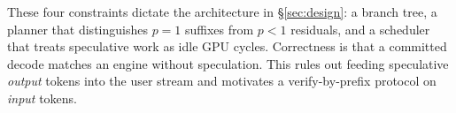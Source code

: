 These four constraints dictate the architecture in \S\ref{sec:design}: a branch tree, a planner that distinguishes $p{=}1$ suffixes from $p{<}1$ residuals, and a scheduler that treats speculative work as idle GPU cycles.
Correctness is that a committed decode matches an engine without speculation.
This rules out feeding speculative \emph{output} tokens into the user stream and motivates a verify-by-prefix protocol on \emph{input} tokens.
